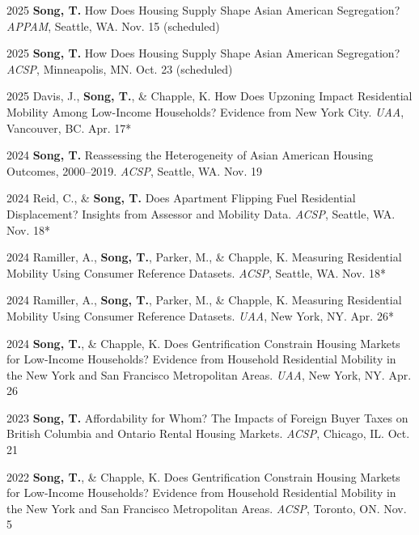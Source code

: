 \documentclass[11pt,letterpaper]{article}
\newcommand{\term}[1]{(#1)}
\begin{document}
\begin{tablist}
  \item[2025] \tab{}\textbf{Song, T.} How Does Housing Supply Shape Asian American Segregation?  
    \emph{APPAM}, Seattle, WA. Nov. 15 \term{scheduled}

  \item[2025] \tab{}\textbf{Song, T.} How Does Housing Supply Shape Asian American Segregation?  
    \emph{ACSP}, Minneapolis, MN. Oct. 23 \term{scheduled}

  \item[2025] \tab{}Davis, J., \textbf{Song, T.}, \& Chapple, K. How Does Upzoning Impact Residential Mobility Among Low-Income Households? Evidence from New York City.  
    \emph{UAA}, Vancouver, BC. Apr. 17*

  \item[2024] \tab{}\textbf{Song, T.} Reassessing the Heterogeneity of Asian American Housing Outcomes, 2000–2019.  
    \emph{ACSP}, Seattle, WA. Nov. 19

  \item[2024] \tab{}Reid, C., \& \textbf{Song, T.} Does Apartment Flipping Fuel Residential Displacement? Insights from Assessor and Mobility Data.  
    \emph{ACSP}, Seattle, WA. Nov. 18*

  \item[2024] \tab{}Ramiller, A., \textbf{Song, T.}, Parker, M., \& Chapple, K. Measuring Residential Mobility Using Consumer Reference Datasets.  
    \emph{ACSP}, Seattle, WA. Nov. 18*

  \item[2024] \tab{}Ramiller, A., \textbf{Song, T.}, Parker, M., \& Chapple, K. Measuring Residential Mobility Using Consumer Reference Datasets.  
    \emph{UAA}, New York, NY. Apr. 26*

  \item[2024] \tab{}\textbf{Song, T.}, \& Chapple, K. Does Gentrification Constrain Housing Markets for Low-Income Households? Evidence from Household Residential Mobility in the New York and San Francisco Metropolitan Areas.  
    \emph{UAA}, New York, NY. Apr. 26

  \item[2023] \tab{}\textbf{Song, T.} Affordability for Whom? The Impacts of Foreign Buyer Taxes on British Columbia and Ontario Rental Housing Markets.  
    \emph{ACSP}, Chicago, IL. Oct. 21

  \item[2022] \tab{}\textbf{Song, T.}, \& Chapple, K. Does Gentrification Constrain Housing Markets for Low-Income Households? Evidence from Household Residential Mobility in the New York and San Francisco Metropolitan Areas.  
    \emph{ACSP}, Toronto, ON. Nov. 5
\end{tablist}
\end{document}

